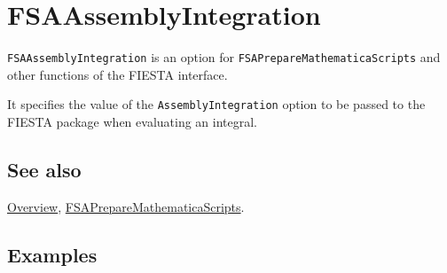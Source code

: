 \documentclass[../FeynHelpersManual.tex]{subfiles}
\begin{document}
\begin{Shaded}
\begin{Highlighting}[]
 
\end{Highlighting}
\end{Shaded}

\hypertarget{fsaassemblyintegration}{
\section{FSAAssemblyIntegration}\label{fsaassemblyintegration}}

\texttt{FSAAssemblyIntegration} is an option for
\texttt{FSAPrepareMathematicaScripts} and other functions of the FIESTA
interface.

It specifies the value of the \texttt{AssemblyIntegration} option to be
passed to the FIESTA package when evaluating an integral.

\subsection{See also}

\hyperlink{toc}{Overview},
\hyperlink{fsapreparemathematicascripts}{FSAPrepareMathematicaScripts}.

\subsection{Examples}
\end{document}
